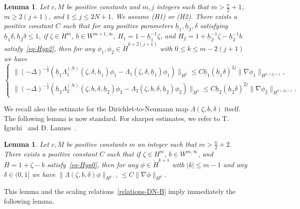 \documentclass[11pt,leqno]{article}
\newtheorem{lemma}[theorem]{\bf Lemma}
\numberwithin{equation}{section}
\numberwithin{figure}{section}
\begin{document}
\begin{lemma}\label{L.L-estimate-D2N-3}
Let $c, M$ be positive constants and $m,j$ integers such that $m>\frac{n}{2}+1$, $m\geq 2(j+1)$, and $1\leq j\leq 2N+1$. 
We assume {\rm (H1)} or {\rm (H2)}. 
There exists a positive constant $C$ such that for any positive parameters 
$\underline{h}_1, \underline{h}_2, \delta$ satisfying $\underline{h}_1\delta, \underline{h}_2\delta \leq 1$, 
if $\zeta\in H^m$, $b\in W^{m+1,\infty}$, $H_1 = 1 - \underline{h}_1^{-1}\zeta$, 
and $H_2 = 1 + \underline{h}_2^{-1}\zeta - \underline{h}_2^{-1}b$ satisfy~\eqref{eq-Hyp2}, 
then for any $\phi_1,\phi_2 \in \mathring{H}^{k+2(j+1)}$ with $0\leq k\leq m-2(j+1)$ we have 
%
\[
\begin{cases}
 \|(-\Delta)^{-\frac12}(\underline{h}_1\Lambda_1^{(N)}(\zeta,\delta,\underline{h}_1)\phi_1
  - \Lambda_1(\zeta,\delta,\underline{h}_1)\phi_1)\|_{H^k}
  \leq C \underline{h}_1(\underline{h}_1\delta)^{2j}\|\nabla \phi_1\|_{H^{k+2j+1}}, \\
 \|(-\Delta)^{-\frac12}(\underline{h}_2\Lambda_2^{(N)}(\zeta,b,\delta,\underline{h}_2)\phi_2
  - \Lambda_2(\zeta,b,\delta,\underline{h}_2)\phi_2)\|_{H^k}
  \leq C \underline{h}_2(\underline{h}_2\delta)^{2j}\|\nabla \phi_2\|_{H^{k+2j+1}}.
\end{cases}
\]
\end{lemma}


We recall also the estimate for the Dirichlet-to-Neumann map $\Lambda(\zeta,b,\delta)$ itself. 
The following lemma is now standard. 
For sharper estimates, we refer to T. Iguchi~\cite{Iguchi2009} and D. Lannes~\cite{Lannes2013-2}. 


\begin{lemma}\label{L.estimate-DN}
Let $c, M$ be positive constants $m$ an integer such that $m>\frac{n}{2}+2$. 
There exists a positive constant $C$ such that if $\zeta\in H^m$, $b\in W^{m,\infty}$, and $H=1+\zeta-b$ satisfy~\eqref{eq-Hyp0}, 
then for any $\phi\in\mathring{H}^{k+1}$ with $|k|\leq m-1$ and any $\delta\in(0,1]$ we have 
$\|\Lambda(\zeta,b,\delta)\phi\|_{H^{k-1}} \leq C \|\nabla \phi\|_{H^k}$. 
\end{lemma}


This lemma and the scaling relations~\eqref{relations-DN-B} imply immediately the following lemma. 
\end{document}
